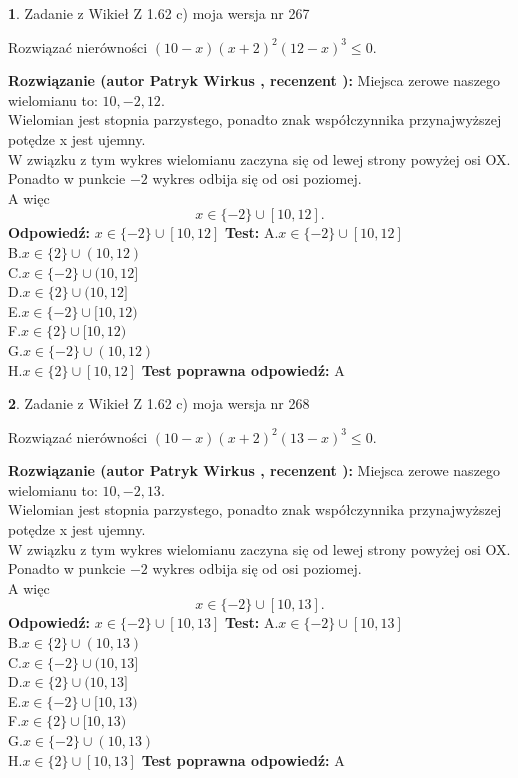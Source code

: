 \documentclass[12pt, a4paper]{article}
\theoremstyle{definition} %
\newtheorem{zad}{}
\newcommand{\zadStart}[1]{\begin{zad}#1\newline}
\newcommand{\zadStop}{\end{zad}}
\newcommand{\rozwStart}[2]{\noindent \textbf{Rozwiązanie (autor #1 , recenzent #2): }\newline}
\newcommand{\rozwStop}{\newline}
\newcommand{\odpStart}{\noindent \textbf{Odpowiedź:}\newline}
\newcommand{\odpStop}{\newline}
\newcommand{\testStart}{\noindent \textbf{Test:}\newline}
\newcommand{\testStop}{\newline}
\newcommand{\kluczStart}{\noindent \textbf{Test poprawna odpowiedź:}\newline}
\newcommand{\kluczStop}{\newline}
\begin{document}
\zadStart{Zadanie z Wikieł Z 1.62 c) moja wersja nr 267}

Rozwiązać nierówności $(10-x)(x+2)^{2}(12-x)^{3}\le0$.
\zadStop
\rozwStart{Patryk Wirkus}{}
Miejsca zerowe naszego wielomianu to: $10, -2, 12$.\\
Wielomian jest stopnia parzystego, ponadto znak współczynnika przy\linebreak najwyższej potędze x jest ujemny.\\ W związku z tym wykres wielomianu zaczyna się od lewej strony powyżej osi OX.\\
Ponadto w punkcie $-2$ wykres odbija się od osi poziomej.\\
A więc $$x \in \{-2\} \cup [10,12].$$
\rozwStop
\odpStart
$x \in \{-2\} \cup [10,12]$
\odpStop
\testStart
A.$x \in \{-2\} \cup [10,12]$\\
B.$x \in \{2\} \cup (10,12)$\\
C.$x \in \{-2\} \cup (10,12]$\\
D.$x \in \{2\} \cup (10,12]$\\
E.$x \in \{-2\} \cup [10,12)$\\
F.$x \in \{2\} \cup [10,12)$\\
G.$x \in \{-2\} \cup (10,12)$\\
H.$x \in \{2\} \cup [10,12]$
\testStop
\kluczStart
A
\kluczStop



\zadStart{Zadanie z Wikieł Z 1.62 c) moja wersja nr 268}

Rozwiązać nierówności $(10-x)(x+2)^{2}(13-x)^{3}\le0$.
\zadStop
\rozwStart{Patryk Wirkus}{}
Miejsca zerowe naszego wielomianu to: $10, -2, 13$.\\
Wielomian jest stopnia parzystego, ponadto znak współczynnika przy\linebreak najwyższej potędze x jest ujemny.\\ W związku z tym wykres wielomianu zaczyna się od lewej strony powyżej osi OX.\\
Ponadto w punkcie $-2$ wykres odbija się od osi poziomej.\\
A więc $$x \in \{-2\} \cup [10,13].$$
\rozwStop
\odpStart
$x \in \{-2\} \cup [10,13]$
\odpStop
\testStart
A.$x \in \{-2\} \cup [10,13]$\\
B.$x \in \{2\} \cup (10,13)$\\
C.$x \in \{-2\} \cup (10,13]$\\
D.$x \in \{2\} \cup (10,13]$\\
E.$x \in \{-2\} \cup [10,13)$\\
F.$x \in \{2\} \cup [10,13)$\\
G.$x \in \{-2\} \cup (10,13)$\\
H.$x \in \{2\} \cup [10,13]$
\testStop
\kluczStart
A
\kluczStop
\end{document}
